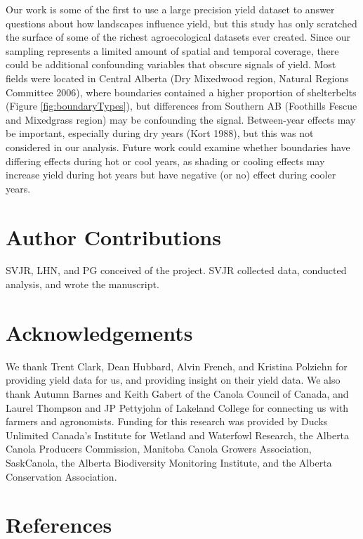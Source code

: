 \documentclass[]{elsarticle} %
\begin{document}
Our work is some of the first to use a large precision yield dataset to answer questions about how landscapes influence yield, but this study has only scratched the surface of some of the richest agroecological datasets ever created.
Since our sampling represents a limited amount of spatial and temporal coverage, there could be additional confounding variables that obscure signals of yield.
Most fields were located in Central Alberta (Dry Mixedwood region, Natural Regions Committee 2006), where boundaries contained a higher proportion of shelterbelts (Figure \ref{fig:boundaryTypes}), but differences from Southern AB (Foothills Fescue and Mixedgrass region) may be confounding the signal.
Between-year effects may be important, especially during dry years (Kort 1988), but this was not considered in our analysis.
Future work could examine whether boundaries have differing effects during hot or cool years, as shading or cooling effects may increase yield during hot years but have negative (or no) effect during cooler years.

\hypertarget{author-contributions}{%
\section{Author Contributions}\label{author-contributions}}

SVJR, LHN, and PG conceived of the project.
SVJR collected data, conducted analysis, and wrote the manuscript.

\hypertarget{acknowledgements}{%
\section{Acknowledgements}\label{acknowledgements}}

We thank Trent Clark, Dean Hubbard, Alvin French, and Kristina Polziehn for providing yield data for us, and providing insight on their yield data.
We also thank Autumn Barnes and Keith Gabert of the Canola Council of Canada, and Laurel Thompson and JP Pettyjohn of Lakeland College for connecting us with farmers and agronomists.
Funding for this research was provided by Ducks Unlimited Canada's Institute for Wetland and Waterfowl Research, the Alberta Canola Producers Commission, Manitoba Canola Growers Association, SaskCanola, the Alberta Biodiversity Monitoring Institute, and the Alberta Conservation Association.

\hypertarget{references}{%
\section*{References}\label{references}}
\end{document}
